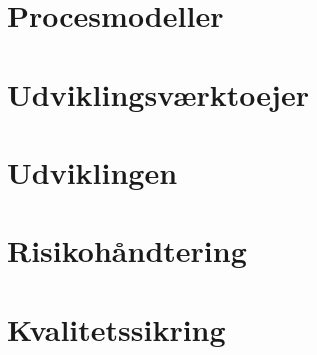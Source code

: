 \chapter{Procesmodeller}\label{ch:procesmodeller}



\chapter{Udviklingsværktoejer}\label{ch:udviklingsvaerktoejer}



\chapter{Udviklingen}\label{ch:udviklingen}



\chapter{Risikohåndtering}\label{ch:risikohaandtering}


\chapter{Kvalitetssikring}\label{ch:kvalitetssikring}




